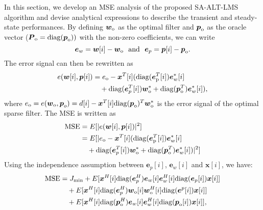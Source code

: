 \documentclass[10pt,onecolumn]{IEEEtran}
\begin{document}
In this section, we develop an MSE analysis of the proposed
SA-ALT-LMS algorithm and devise analytical expressions to describe
the transient and steady-state performances. By defining
${\boldsymbol w}_{\rm o}$ as the optimal filter and ${\boldsymbol
p}_{\rm o}$ as the oracle vector (${\boldsymbol P}_{\rm o} = {\rm
diag}({\boldsymbol p}_{\rm o}))$ with the non-zero coefficients, we
can write
\begin{equation}
{\boldsymbol e}_{w} = {\boldsymbol w}[i] - { \boldsymbol w}_{\rm o} ~~ {\rm and} ~~
{\boldsymbol e}_{p} = {\boldsymbol p}[i] - {\boldsymbol p}_{\rm o}.
\end{equation}
The error signal can then be rewritten as
\begin{equation}
\begin{split}
e({\boldsymbol w}[i],{\boldsymbol p}[i]) & = e_{\rm o} -
{\boldsymbol x}^T[i]( {\rm diag}({\boldsymbol e}_{\rm p}^T[i])
{\boldsymbol e}_{w}^*[i] \\ & \quad + {\rm diag}( {\boldsymbol
e}_{p}^T[i]) {\boldsymbol w}_{\rm o}^* + {\rm diag} ({\boldsymbol
p}_{\rm o}^T) {\boldsymbol e}_{w}^*[i]),
\end{split}
\end{equation}
where $e_{\rm o}=e({\boldsymbol w}_{\rm o}, {\boldsymbol p}_o) =
d[i] - {\boldsymbol x}^T[i] {\rm diag} ({\boldsymbol p}_{\rm o})^T
{\boldsymbol w}_{\rm o}^*$ is the error signal of the optimal sparse
filter. The MSE is written as
\begin{equation}
\begin{split}
{\rm MSE} & = E[ |e({\boldsymbol w}[i],{\boldsymbol p}[i])|^2] \\
& = E[|e_{\rm o} - {\boldsymbol x}^T[i]( {\rm diag}({\boldsymbol
e}_{\rm p}^T[i]) {\boldsymbol e}_{w}^*[i] \\ & \quad + {\rm diag}(
{\boldsymbol e}_{p}^T[i]) {\boldsymbol w}_{\rm o}^* + {\rm diag}
({\boldsymbol p}_{\rm o}^T) {\boldsymbol e}_{w}^*[i])|^2]
\end{split}
\end{equation}
Using the independence assumption between ${\boldsymbol e}_{p}[i]$,
${\boldsymbol e}_{w}[i]$ and ${\boldsymbol x}[i]$, we have:
\begin{equation}
\begin{split}
{\rm MSE} & = J_{\rm min} + E[{\boldsymbol x}^H[i] {\rm
diag}({\boldsymbol e}_{p}^H) {\boldsymbol e}_{w}[i]{\boldsymbol
e}_{w}^H[i] {\rm diag} ({\boldsymbol e}_{p}[i])
{\boldsymbol x}[i]] \\
& \quad +  E[{\boldsymbol x}^H[i] {\rm diag}({\boldsymbol e}_{p}^H)
{\boldsymbol w}_{\rm o}[i]{\boldsymbol w}_{\rm o}^H[i] {\rm diag}
({\boldsymbol e}^{p}[i])
{\boldsymbol x}[i]] \\
& \quad +  E[{\boldsymbol x}^H[i] {\rm diag}({\boldsymbol p}_{\rm
o}^H) {\boldsymbol e}_{w}[i]{\boldsymbol e}_{w}^H[i] {\rm diag}
({\boldsymbol p}_{\rm o}[i]) {\boldsymbol x}[i]],
\end{split}
\end{equation}
\end{document}
